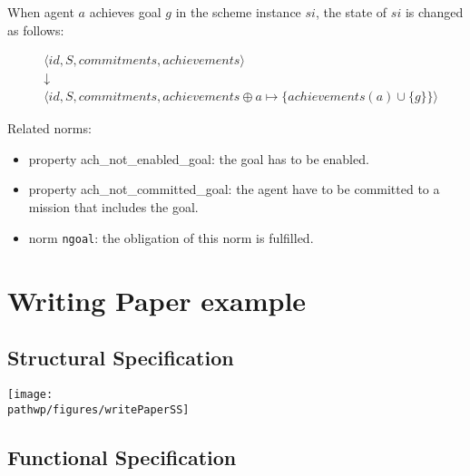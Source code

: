 \documentclass{article}
\newcommand{\code}[1]{\texttt{#1}}
\newcommand{\pathwp}{../../examples/writePaper}
\theoremstyle{definition} \newtheorem{definition}{Definition}
\begin{document}
When agent $a$ achieves goal $g$ in the scheme instance $si$, the
state of $si$ is changed as follows:

\begin{eqnarray*}
& \langle id, S, commitments, achievements \rangle \\
&  \downarrow \\
& \langle id, S, commitments, achievements  \oplus a \mapsto \{ achievements(a) \cup \{g\} \}\rangle
\end{eqnarray*}

Related norms:
\begin{itemize}
\item property ach\_not\_enabled\_goal: the goal has to be enabled.
\item property ach\_not\_committed\_goal: the agent have to be
  committed to a mission that includes the goal.
\item norm \code{ngoal}: the obligation of this norm is fulfilled. 
\end{itemize}


\appendix

\section{Writing Paper example} \label{apx:wp}

\subsection{Structural Specification}

\begin{center}
  \texttt{[image: \\pathwp/figures/writePaperSS]}
\end{center}

\subsection{Functional Specification}
\end{document}
